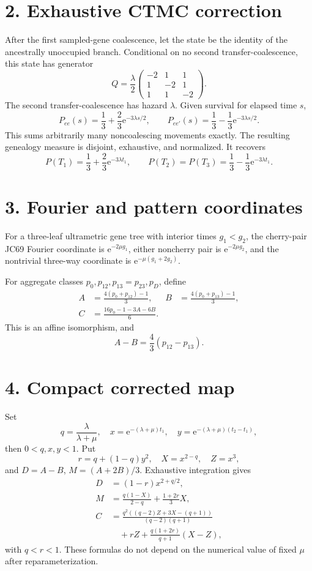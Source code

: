 \documentclass[10pt,twocolumn]{extarticle}
\newcommand{\e}{\mathrm e}
\begin{document}
\section*{2. Exhaustive CTMC correction}
After the first sampled-gene coalescence, let the state be the identity of the ancestrally unoccupied branch.  Conditional on no second transfer-coalescence, this state has generator
\[
Q=\frac{\lambda}{2}
\begin{pmatrix}-2&1&1\\1&-2&1\\1&1&-2\end{pmatrix}.
\]
The second transfer-coalescence has hazard $\lambda$.  Given survival for elapsed time $s$,
\[
P_{ee}(s)=\frac13+\frac23\e^{-3\lambda s/2},\qquad
P_{ee'}(s)=\frac13-\frac13\e^{-3\lambda s/2}.
\]
This sums arbitrarily many noncoalescing movements exactly.  The resulting genealogy measure is disjoint, exhaustive, and normalized.  It recovers
\[
P(T_1)=\frac13+\frac23\e^{-3\lambda t_1},\qquad
P(T_2)=P(T_3)=\frac13-\frac13\e^{-3\lambda t_1}.
\]

\section*{3. Fourier and pattern coordinates}
For a three-leaf ultrametric gene tree with interior times $g_1<g_2$, the cherry-pair JC69 Fourier coordinate is $\e^{-2\mu g_1}$, either noncherry pair is $\e^{-2\mu g_2}$, and the nontrivial three-way coordinate is $\e^{-\mu(g_1+2g_2)}$.

For aggregate classes $p_0,p_{12},p_{13}=p_{23},p_D$, define
\begin{align*}
A&=\frac{4(p_0+p_{12})-1}{3},&
B&=\frac{4(p_0+p_{13})-1}{3},\\
C&=\frac{16p_0-1-3A-6B}{6}.
\end{align*}
This is an affine isomorphism, and
\[
A-B=\frac43(p_{12}-p_{13}).
\]

\section*{4. Compact corrected map}
Set
\[
q=\frac{\lambda}{\lambda+\mu},\quad
x=\e^{-(\lambda+\mu)t_1},\quad
y=\e^{-(\lambda+\mu)(t_2-t_1)},
\]
then $0<q,x,y<1$.  Put
\[
r=q+(1-q)y^2,\quad X=x^{2-q},\quad Z=x^3,
\]
and $D=A-B$, $M=(A+2B)/3$.  Exhaustive integration gives
\begin{align*}
D&=(1-r)x^{2+q/2},\\
M&=\frac{q(1-X)}{2-q}+\frac{1+2r}{3}X,\\
C&=\frac{q^2((q-2)Z+3X-(q+1))}{(q-2)(q+1)}\\
&\quad+rZ+\frac{q(1+2r)}{q+1}(X-Z),
\end{align*}
with $q<r<1$.  These formulas do not depend on the numerical value of fixed $\mu$ after reparameterization.
\end{document}

